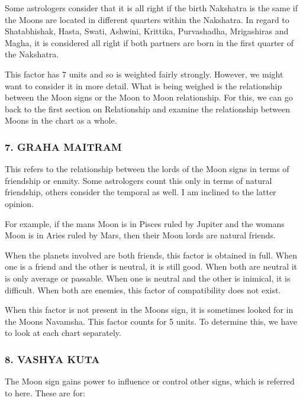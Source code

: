 Some astrologers consider that it is all right if the birth Nakshatra is the same if the Moons are located in different quarters within the Nakshatra. In regard to Shatabhishak, Hasta, Swati, Ashwini, Krittika, Purvashadha, Mrigashiras and Magha, it is considered all right if both partners are born in the first quarter of the Nakshatra.

 

This factor has 7 units and so is weighted fairly strongly. However, we might want to consider it in more detail. What is being weighed is the relationship between the Moon signs or the Moon to Moon relationship. For this, we can go back to the first section on Relationship and examine the relationship between Moons in the chart as a whole.

 

\subsubsection{7. GRAHA MAITRAM}
 

This refers to the relationship between the lords of the Moon signs in terms of friendship or enmity. Some astrologers count this only in terms of natural friendship, others consider the temporal as well. I am inclined to the latter opinion.

 

For example, if the mans Moon is in Pisces ruled by Jupiter and the womans Moon is in Aries ruled by Mars, then their Moon lords are natural friends.

 

When the planets involved are both friends, this factor is obtained in full. When one is a friend and the other is neutral, it is still good. When both are neutral it is only average or passable. When one is neutral and the other is inimical, it is difficult. When both are enemies, this factor of compatibility does not exist.

 

When this factor is not present in the Moons sign, it is sometimes looked for in the Moons Navamsha. This factor counts for 5 units. To determine this, we have to look at each chart separately.

 

\subsubsection{8. VASHYA KUTA}
 

The Moon sign gains power to influence or control other signs, which is referred to here. These are for:

